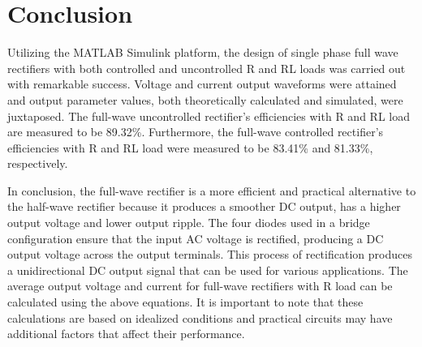 

\pagebreak





\section{Conclusion}


\hspace{\parindent}

Utilizing the MATLAB Simulink platform, the design of single phase full wave rectifiers with both controlled and uncontrolled R and RL loads was carried out with remarkable success. Voltage and current output waveforms were attained and output parameter values, both theoretically calculated and simulated, were juxtaposed.
The full-wave uncontrolled rectifier's efficiencies with R and RL load are measured to be 89.32\%. Furthermore, the full-wave controlled rectifier's efficiencies with R and RL load were measured to be 83.41\% and 81.33\%, respectively.

In conclusion, the full-wave rectifier is a more efficient and practical alternative to the half-wave rectifier because it produces a smoother DC output, has a higher output voltage and lower output ripple. The four diodes used in a bridge configuration ensure that the input AC voltage is rectified, producing a DC output voltage across the output terminals.
This process of rectification produces a unidirectional DC output signal that can be used for various applications.
The average output voltage and current for full-wave rectifiers with R load can be calculated using the above equations. It is important to note that these calculations are based on idealized conditions and practical circuits may have additional factors that affect their performance.
\pagebreak
